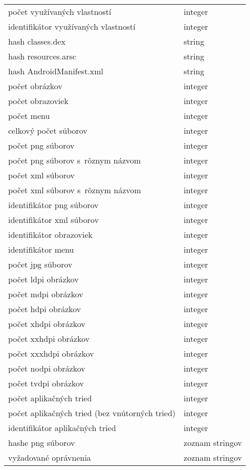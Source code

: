 \begin{longtable}{|l|p{3.3cm}|}
počet využívaných vlastností								& integer \\
identifikátor využívaných vlastností								& integer \\
hash classes.dex						& string \\
hash resources.arsc						& string \\
hash AndroidManifest.xml				& string \\
počet obrázkov							& integer \\
počet obrazoviek							& integer \\				
počet menu							& integer \\
celkový počet súborov							& integer \\
počet png súborov							& integer \\
počet png súborov s~rôznym názvom							& integer \\
počet xml súborov							& integer \\
počet xml súborov s~rôznym názvom							& integer \\
identifikátor png súborov 					& integer \\
identifikátor xml súborov 					& integer \\
identifikátor obrazoviek 					& integer \\
identifikátor menu 					& integer \\
počet jpg súborov 					& integer \\
počet ldpi obrázkov					& integer \\
počet mdpi obrázkov 					& integer \\
počet hdpi obrázkov 					& integer \\
počet xhdpi obrázkov 					& integer \\
počet xxhdpi obrázkov 					& integer \\
počet xxxhdpi obrázkov 					& integer \\
počet nodpi obrázkov 					& integer \\
počet tvdpi obrázkov 					& integer \\
počet aplikačných tried					& integer \\
počet aplikačných tried	(bez vnútorných tried)				& integer \\
identifikátor aplikačných tried					& integer \\
hashe png súborov					& zoznam stringov \\
vyžadované oprávnenia					& zoznam stringov 
  \label{tab:zbieraneData}
\end{longtable}